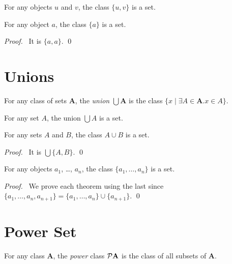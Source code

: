 \begin{axiom}
    For any objects $u$ and $v$, the class $\{ u, v \}$ is a set.
\end{axiom}

\begin{theorem}[Pairing]
    For any object $a$, the class $\{ a \}$ is a set.
\end{theorem}

\begin{proof}
    \pf\ It is $\{ a, a \}$. \qed
\end{proof}

\section{Unions}

\begin{definition}[Union]
    For any class of sets $\mathbf{A}$, the \emph{union} $\bigcup \mathbf{A}$
    is the class $\{x \mid \exists A \in \mathbf{A}. x \in A \}$.
\end{definition}

\begin{axiom}
    For any set $A$, the union $\bigcup A$ is a set.
\end{axiom}

\begin{theorem}
    \label{theorem:union}
    For any sets $A$ and $B$, the class $A \cup B$ is a set.
\end{theorem}

\begin{proof}
    \pf\ It is $\bigcup \{ A, B \}$. \qed
\end{proof}

\begin{theorems}
    For any objects $a_1$, \ldots, $a_n$, the class $\{ a_1, \ldots, a_n \}$
    is a set.
\end{theorems}

\begin{proof}
    \pf\ We prove each theorem using the last since
    $\{ a_1, \ldots, a_n, a_{n+1} \} = \{ a_1, \ldots, a_n \} \cup \{ a_{n+1} \}$. \qed
\end{proof}

\section{Power Set}

\begin{definition}
    For any class $\mathbf{A}$, the \emph{power} class $\mathcal{P} \mathbf{A}$
    is the class of all subsets of $\mathbf{A}$.
\end{definition}


